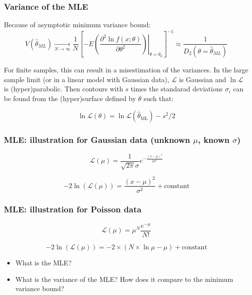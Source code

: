 \documentclass[9pt]{beamer}
\newif\ifmynote
\newcommand\mynote[1]{%
\ifmynote \textbf{#1} \else \fi
}
\begin{document}
\begin{frame}
 \frametitle{Variance of the MLE}
 

 Because of asymptotic minimum variance bound:
 $$V(\hat{\theta}_{ML}) \xrightarrow[N\to\infty]{} \frac{1}{N} \left[ \left.-E\left(\frac{\partial^2\ln f(x;\theta)}{\partial \theta^2}\right)\right|_{\theta=\theta_0} \right]^{-1} \approx \frac{1}{D_2(\theta=\hat{\theta}_{ML})}$$
 
 \vspace{20pt}
 
 For finite samples, this can result in a misestimation of the variances. In the large sample limit (or in a linear model with Gaussian data), $\mathcal{L}$ is Gaussian and $\ln\mathcal{L}$ is (hyper)parabolic. Then contours with $s$ times the standarad deviations $\sigma_i$ can be found from the (hyper)surface defined by $\theta$ such that:
 
 $$\ln\mathcal{L}(\theta) = \ln\mathcal{L}(\hat{\theta}_\text{ML}) - s^2/2$$
 
\end{frame}

\begin{frame}
 \frametitle{MLE: illustration for Gaussian data (unknown $\mu$, known $\sigma$)}
 

 $$\mathcal{L}(\mu) = \frac{1}{\sqrt{2\pi}\sigma} e^{-\frac{(x-\mu)^2}{2\sigma^2}}$$
 
 $$-2\ln(\mathcal{L}(\mu)) = \frac{(x-\mu)^2}{\sigma^2} + \text{constant}$$
 
 \mynote{Jupyter here}
\end{frame}

\begin{frame}
 \frametitle{MLE: illustration for Poisson data}
 
 \mynote{Exercise}
 
 $$\mathcal{L}(\mu) = \mu^N \frac{e^{-\mu}}{N!}$$
 
 $$-2\ln(\mathcal{L}(\mu)) = -2 \times \left(N \times \ln \mu - \mu \right) + \text{constant} $$
 
 \begin{exampleblock}{}
  \begin{itemize}
   \item What is the MLE?
   \item What is the variance of the MLE? How does it compare to the minimum variance bound?
  \end{itemize}

 \end{exampleblock}
 
 \mynote{Jupyter here, + solving in the blackboard. $I_N(\mu) = E(-\frac{\partial^2}{\partial\mu^2} \ln \mathcal{L}(\mu|N)) = E(N/\mu^2) = 1/\mu$}

\end{frame}
\end{document}
